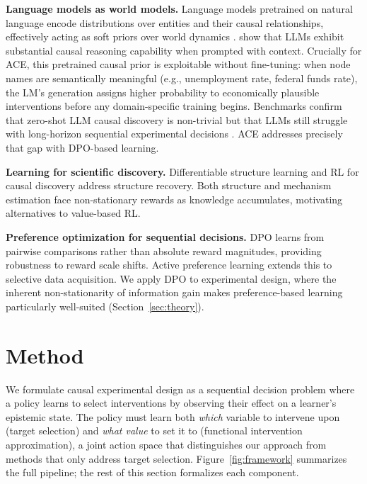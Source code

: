 \documentclass{article}
\theoremstyle{plain}
\theoremstyle{definition}
\theoremstyle{remark}
\begin{document}
\textbf{Language models as world models.} Language models pretrained on natural language encode distributions over entities and their causal relationships, effectively acting as soft priors over world dynamics \citep{hao2023reasoning,xie2022explanation}. \citet{kiciman2023causal} show that LLMs exhibit substantial causal reasoning capability when prompted with context. Crucially for ACE, this pretrained causal prior is exploitable without fine-tuning: when node names are semantically meaningful (e.g., unemployment rate, federal funds rate), the LM's generation assigns higher probability to economically plausible interventions before any domain-specific training begins. Benchmarks confirm that zero-shot LLM causal discovery is non-trivial \citep{llm_science_survey2025} but that LLMs still struggle with long-horizon sequential experimental decisions \citep{boxinggym2025,autobench2025}. ACE addresses precisely that gap with DPO-based learning.

\textbf{Learning for scientific discovery.} Differentiable structure learning \citep{lorch2021dibs} and RL for causal discovery \citep{core2024,gacbo2024} address structure recovery. Both structure and mechanism estimation face non-stationary rewards as knowledge accumulates, motivating alternatives to value-based RL.

\textbf{Preference optimization for sequential decisions.} DPO \citep{rafailov2023direct} learns from pairwise comparisons rather than absolute reward magnitudes, providing robustness to reward scale shifts. Active preference learning \citep{activedpo2024} extends this to selective data acquisition. We apply DPO to experimental design, where the inherent non-stationarity of information gain makes preference-based learning particularly well-suited (Section~\ref{sec:theory}).

\section{Method}
\label{sec:methods}

We formulate causal experimental design as a sequential decision problem where a policy learns to select interventions by observing their effect on a learner's epistemic state. The policy must learn both \emph{which} variable to intervene upon (target selection) and \emph{what value} to set it to (functional intervention approximation), a joint action space that distinguishes our approach from methods that only address target selection. Figure~\ref{fig:framework} summarizes the full pipeline; the rest of this section formalizes each component.
\end{document}
